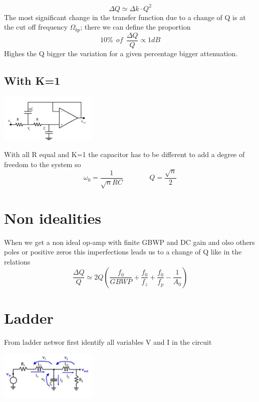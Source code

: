 \begin{equation}
\Delta Q \simeq \Delta k \cdot Q^2
\end{equation}
The most significant change in the transfer function due to a change of Q is at the cut off frequency $\Omega_{bp}$; there we can define the proportion
\begin{equation}
10\% \ \ of \ \ \frac{\Delta Q}{Q} \propto 1dB
\end{equation}
Highes the Q bigger the variation for a given percentage bigger attenuation.\\


\subsection{With K=1}
\centering
\includegraphics[width=0.35\textwidth]{skb.png}\\
\raggedright

With all R equal and K=1 the capacitor has to be different to add a degree of freedom to the system so
\begin{equation}
\omega_0=\frac{1}{\sqrt{n}RC}\ \ \ \ \ \ \ \ \ \ \ \ \ \ \ \ \ Q=\frac{\sqrt{n}}{2}
\end{equation}

\section{Non idealities}
When we get a non ideal op-amp with finite GBWP and DC gain and olso others poles or positive zeros this imperfections leads us to a change of Q like in the relations 
\begin{equation}
\frac{\Delta Q}{Q}\simeq 2Q\left(\frac{f_0}{GBWP}+\frac{f_0}{f_z}+\frac{f_0}{f_p}-\frac{1}{A_0}\right)
\end{equation}

\section{Ladder}

From ladder networ first identify all variables V and I in the circuit 

\centering
\includegraphics[width=0.35\textwidth]{ldd1.png}\\
\raggedright

